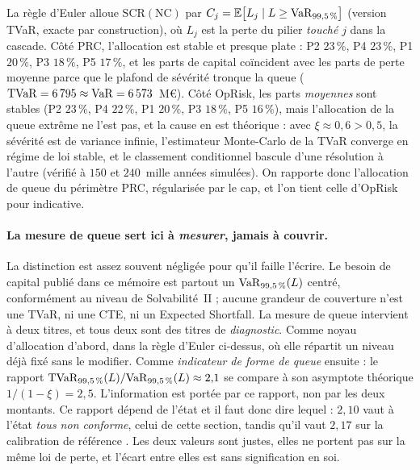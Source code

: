 La règle d'Euler \citep{tasche1999} alloue $\mathrm{SCR}(\text{NC})$ par
$C_j = \mathbb{E}\bigl[L_j \mid L \ge \mathrm{VaR}_{99{,}5\,\%}\bigr]$ (version TVaR, exacte
par construction), où $L_j$ est la perte du pilier \emph{touché} $j$ dans la cascade. Côté
PRC, l'allocation est stable et presque plate : P2 $23\,\%$, P4 $23\,\%$, P1 $20\,\%$,
P3 $18\,\%$, P5 $17\,\%$, et les parts de capital coïncident avec les parts de perte moyenne
parce que le plafond de sévérité tronque la queue
($\mathrm{TVaR} = 6\,795 \approx \mathrm{VaR} = 6\,573$~M\euro). Côté OpRisk, les parts
\emph{moyennes} sont stables (P2 $23\,\%$, P4 $22\,\%$, P1 $20\,\%$, P3 $18\,\%$,
P5 $16\,\%$), mais l'allocation de la queue extrême ne l'est pas, et la cause en est
théorique : avec $\xi \approx 0{,}6 > 0{,}5$, la sévérité est de variance infinie,
l'estimateur Monte-Carlo de la TVaR converge en régime de loi stable, et le classement
conditionnel bascule d'une résolution à l'autre (vérifié à $150$ et $240$~mille années
simulées). On rapporte donc l'allocation de queue du périmètre PRC, régularisée par le cap,
et l'on tient celle d'OpRisk pour indicative.

\paragraph{La mesure de queue sert ici à \emph{mesurer}, jamais à couvrir.} La distinction est
assez souvent négligée pour qu'il faille l'écrire. Le besoin de capital publié dans ce mémoire
est partout un $\mathrm{VaR}_{99{,}5\,\%}(L)$ centré, conformément au niveau de Solvabilité~II ; aucune
grandeur de couverture n'est une TVaR, ni une CTE, ni un Expected Shortfall. La mesure
de queue intervient à deux titres, et tous deux sont des titres de \emph{diagnostic}. Comme
noyau d'allocation d'abord, dans la règle d'Euler ci-dessus, où elle répartit un niveau déjà
fixé sans le modifier. Comme \emph{indicateur de forme de queue} ensuite : le rapport
$\mathrm{TVaR}_{99{,}5\,\%}(L)/\mathrm{VaR}_{99{,}5\,\%}(L) \approx 2{,}1$ se compare à son asymptote théorique
$1/(1-\xi) = 2{,}5$. L'information est portée par ce rapport, non par les deux montants.
Ce rapport dépend de l'état et il faut
donc dire lequel : $2{,}10$ vaut à l'état \emph{tous non conforme}, celui de cette section, tandis
qu'il vaut $2{,}17$ sur la calibration de référence \matcomp. Les deux
valeurs sont justes, elles ne portent pas sur la même loi de perte, et l'écart entre elles est
sans signification en soi.

